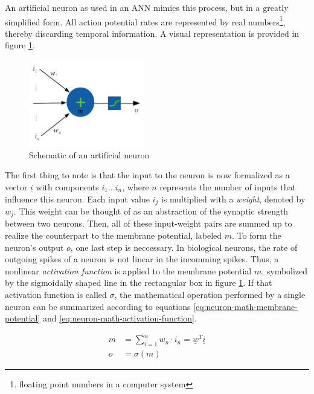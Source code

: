 \documentclass[11pt, a4paper]{article}
\newcommand\braces[1]{\left(#1\right)}
\renewcommand{\vec}[1]{\underline{#1}}
\begin{document}
An artificial neuron as used in an ANN mimics this process, but in a greatly simplified form. All action potential rates are represented by real numbers\footnote{floating point numbers in a computer system}, thereby discarding temporal information. A visual representation is provided in figure \ref{fig:artificial-neuron-schematic}.


\begin{figure}[h!tb]
	\centering
	\includegraphics[width=0.45\textwidth]{images/artificial_neuron.png}
	\caption[Artificial neuron]{Schematic of an artificial neuron}
	\label{fig:artificial-neuron-schematic}
\end{figure}

The first thing to note is that the input to the neuron is now formalized as a vector $\vec{i}$ with components $i_1 \dots i_n$, where $n$ represents the number of inputs that influence this neuron. Each input value $i_j$ is multiplied with a \emph{weight}, denoted by $w_j$. This weight can be thought of as an abstraction of the synaptic strength between two neurons. Then, all of these input-weight pairs are summed up to realize the counterpart to the membrane potential, labeled $m$. To form the neuron's output $o$, one last step is neccessary. In biological neurons, the rate of outgoing spikes of a neuron is not linear in the incomming spikes. Thus, a nonlinear \emph{activation function} is applied to the membrane potential $m$, symbolized by the sigmoidally shaped line in the rectangular box in figure \ref{fig:artificial-neuron-schematic}. If that activation function is called $\sigma$, the mathematical operation performed by a single neuron can be summarized according to equations \eqref{eq:neuron-math-membrane-potential} and \eqref{eq:neuron-math-activation-function}.

\begin{align}
	m &= \sum_{i=1}^n w_n \cdot i_n = \vec{w}^T \vec{i} \label{eq:neuron-math-membrane-potential} \\
	o &= \sigma \braces{m} \label{eq:neuron-math-activation-function}
\end{align}
\end{document}
